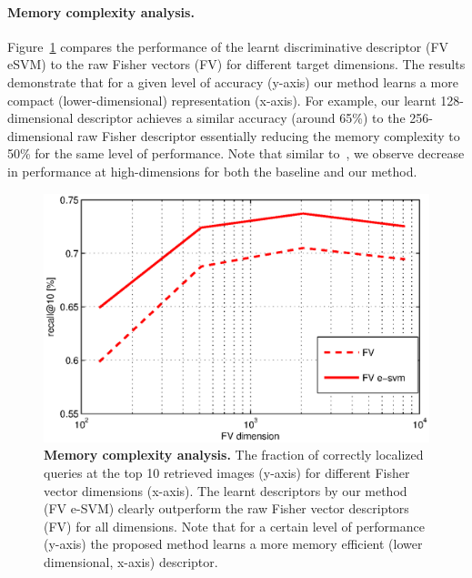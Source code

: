 \documentclass[10pt,twocolumn,letterpaper]{article}
\begin{document}
      \paragraph{Memory complexity analysis.}
         Figure~\ref{fig:memory} compares the performance of the learnt discriminative descriptor (FV eSVM) to the raw Fisher vectors (FV) for different target dimensions. 
         The results demonstrate that for a given level of accuracy (y-axis) our method learns a more compact (lower-dimensional) representation (x-axis). For example, our learnt 128-dimensional descriptor achieves a similar accuracy (around 65\%) to the 256-dimensional raw Fisher descriptor essentially reducing the memory complexity to 50\% for the same level of performance.  Note that 
         similar to~\cite{Jegou12}, we observe decrease in performance at high-dimensions for both the baseline and our method.
         \begin{figure}[t!]
            \centering
            \includegraphics[width=1.0\linewidth]{imgs/FVmemory}    
            \caption{
               \textbf{Memory complexity analysis.} 
               The fraction of correctly localized queries at the top 10 retrieved images (y-axis) for different Fisher vector dimensions (x-axis). The learnt descriptors by our method (FV e-SVM) clearly outperform the raw Fisher vector descriptors (FV) for all dimensions. Note that for a certain level of performance (y-axis) the proposed method learns a more memory efficient (lower dimensional, x-axis) descriptor.
            }
            \label{fig:memory}
         \end{figure}
\end{document}
